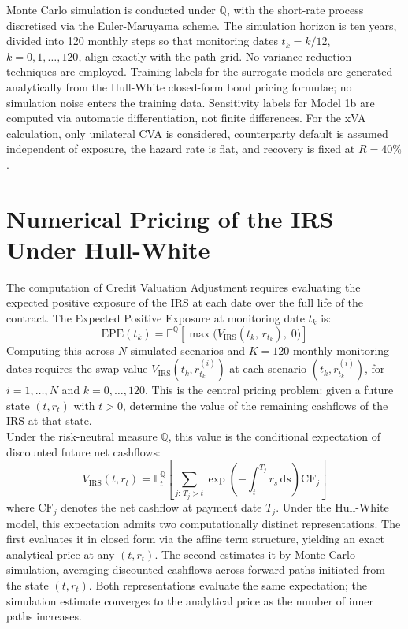   \noindent
  Monte Carlo simulation is conducted under $\mathbb{Q}$, with the short-rate process discretised via the Euler-Maruyama scheme. The simulation horizon is ten years, divided into 120 monthly steps so that monitoring dates $t_k = k/12$, $k = 0,1,\ldots,120$, align exactly with the path grid. No variance reduction techniques are employed. Training labels for the surrogate models are generated
  analytically from the Hull-White closed-form bond pricing formulae; no simulation noise enters the training data. Sensitivity labels for Model 1b are computed via automatic differentiation, not finite differences. For the xVA calculation, only unilateral CVA is considered, counterparty default is assumed independent of exposure, the hazard rate is flat, and recovery is fixed at $R = 40\%$.



  \section{Numerical Pricing of the IRS Under Hull-White}
  \label{sec:numerical_pricing}

  The computation of Credit Valuation Adjustment requires evaluating the expected positive exposure of the IRS at each date over the full life of the contract. The Expected Positive Exposure at monitoring date $t_k$ is:
  \begin{equation}
    \mathrm{EPE}(t_k)
      = \mathbb{E}^{\mathbb{Q}}\!\left[
          \max\!\bigl(V_{\mathrm{IRS}}(t_k,\,r_{t_k}),\;0\bigr)
        \right]
  \end{equation}
  Computing this across $N$ simulated scenarios and $K = 120$ monthly monitoring dates requires the swap value $V_{\mathrm{IRS}}(t_k, r_{t_k}^{(i)})$ at each scenario $(t_k, r_{t_k}^{(i)})$, for $i = 1,\ldots,N$ and $k = 0,\ldots,120$. This is the central pricing problem: given a future state $(t, r_t)$ with $t > 0$, determine the value of the remaining cashflows of the IRS at that state. \\

  \noindent
  Under the risk-neutral measure $\mathbb{Q}$, this value is the conditional expectation of discounted future net cashflows:
  \begin{equation}
    V_{\mathrm{IRS}}(t, r_t)
      = \mathbb{E}^{\mathbb{Q}}_t\!\left[
          \sum_{j:\,T_j > t}
          \exp\!\left(-\int_t^{T_j} r_s\,\mathrm{d}s\right)\mathrm{CF}_j
        \right]
    \label{eq:rn_pricing}
  \end{equation}
  where $\mathrm{CF}_j$ denotes the net cashflow at payment date $T_j$. Under the Hull-White model, this expectation admits two computationally distinct representations. The first evaluates it in closed form via the affine term structure, yielding an exact analytical price at any $(t, r_t)$. The second estimates it by Monte Carlo simulation, averaging discounted cashflows across forward paths initiated from the state $(t, r_t)$. Both representations evaluate the same expectation; the simulation estimate converges to the analytical price as the number of inner paths increases. \\


